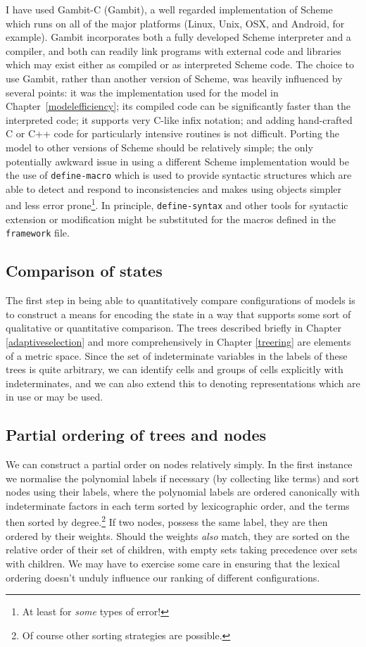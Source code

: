 I have used \textsf{Gambit-C} (\textsf{Gambit}), a well regarded
implementation of \textsf{Scheme} which runs on all of the major
platforms (Linux, Unix, OSX, and Android, for
example). \textsf{Gambit} incorporates both a fully developed
\textsf{Scheme} interpreter and a compiler, and both can readily link
programs with external code and libraries which may exist either as
compiled or as interpreted \textsf{Scheme} code. The choice to use
\textsf{Gambit}, rather than another version of \textsf{Scheme}, was
heavily influenced by several points: it was the implementation used
for the model in Chapter~\ref{modelefficiency}; its compiled code can
be significantly faster than the interpreted code; it supports very
\textsf{C}-like infix notation; and adding hand-crafted \textsf{C} or
\textsf{C++} code for particularly intensive routines is not
difficult.  Porting the model to other versions of \textsf{Scheme}
should be relatively simple; the only potentially awkward issue in
using a different \textsf{Scheme} implementation would be the use of
\texttt{define-macro} which is used to provide syntactic structures
which are able to detect and respond to inconsistencies and makes
using objects simpler and less error prone\footnote{At least for
  \emph{some} types of error!}.  In principle, \texttt{define-syntax}
and other tools for syntactic extension or modification might be
substituted for the macros defined in the \texttt{framework} file.

\subsection{Comparison of states}
The first step in being able to quantitatively compare configurations
of models is to construct a means for encoding the state in a way that
supports some sort of qualitative or quantitative comparison.  The
trees described briefly in Chapter \ref{adaptiveselection} and more
comprehensively in Chapter \ref{treering} are elements of a metric
space. Since the set of indeterminate variables in the labels of these
trees is quite arbitrary, we can identify cells and groups of cells
explicitly with indeterminates, and we can also extend this to
denoting representations which are in use or may be used.

\subsection{Partial ordering of trees and nodes}\label{partial-order}
We can construct a partial order on nodes relatively simply.  In the
first instance we normalise the polynomial labels if necessary (by
collecting like terms) and sort nodes using their labels, where the polynomial labels are
ordered canonically with indeterminate factors in each term sorted by
lexicographic order, and the terms then sorted by degree.\footnote{Of course
other sorting strategies are possible.} If two nodes, possess the same
label, they are then ordered by their weights.  Should the weights
\emph{also} match, they are sorted on the relative order of their set
of children, with empty sets taking precedence over sets with
children. We may have to exercise some care in ensuring that the
lexical ordering doesn't unduly influence our ranking of different
configurations. 


